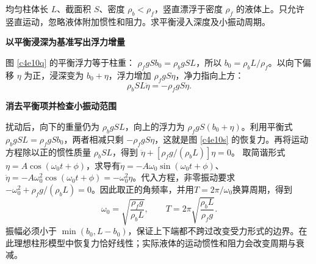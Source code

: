 \begin{question}
\begin{example}[浮柱的竖直小振动]
均匀柱体长 $L$、截面积 $S$、密度 $\rho_b<\rho_f$，竖直漂浮于密度 $\rho_f$ 的液体上。只允许竖直运动，忽略液体附加惯性和阻力。求平衡浸入深度及小振动周期。
\end{example}
\end{question}
\begin{solution}\textbf{以平衡浸深为基准写出浮力增量}\par\nobreak
图 \ref{c4e10q} 的平衡浮力等于柱重：
$\rho_fgSb_0=\rho_bgSL$，所以 $b_0=\rho_bL/\rho_f$。以向下偏移 $\eta$ 为正，浸深变为 $b_0+\eta$，浮力增加 $\rho_fgS\eta$，净力指向上方：
\[
 \rho_bSL\ddot\eta=-\rho_fgS\eta.
\]



\par\medskip{}\noindent\textbf{消去平衡项并检查小振动范围}\par\nobreak
扰动后，向下的重量仍为 $\rho_bgSL$，向上的浮力为 $\rho_fgS(b_0+\eta)$。利用平衡式 $\rho_bgSL=\rho_fgSb_0$，两者相减只剩 $-\rho_fgS\eta$，这就是图 \ref{c4e10s} 的恢复力。再将运动方程除以正的惯性质量 $\rho_bSL$，得到
$\ddot\eta+[\rho_fg/(\rho_bL)]\eta=0$。
取简谐形式$\eta=A\cos(\omega_0t+\phi)$，求导有$\dot\eta=-A\omega_0\sin(\omega_0t+\phi)$、$\ddot\eta=-A\omega_0^2\cos(\omega_0t+\phi)=-\omega_0^2\eta$。代入方程，非零振动要求$-\omega_0^2+\rho_fg/(\rho_bL)=0$。因此取正的角频率，并用$T=2\pi/\omega_0$换算周期，得到
\[
 \boxed{\omega_0=\sqrt{\frac{\rho_fg}{\rho_bL}}},\qquad
 \boxed{T=2\pi\sqrt{\frac{\rho_bL}{\rho_fg}}}.
\]
振幅必须小于 $\min(b_0,L-b_0)$，保证上下端都不跨过改变受力形式的边界。在此理想柱形模型中恢复力恰好线性；实际液体的运动惯性和阻力会改变周期与衰减。
\end{solution}

